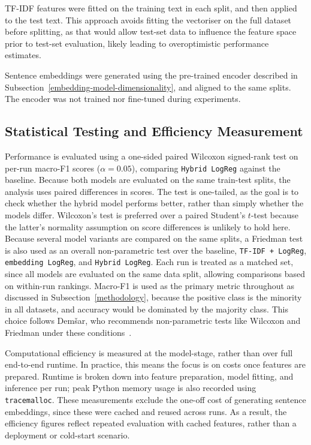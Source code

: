 \documentclass[10pt,a4paper]{article}
\begin{document}
TF-IDF features were fitted on the training text in each split, and then applied to the test text. This approach avoids fitting the vectoriser on the full dataset before splitting, as that would allow test-set data to influence the feature space prior to test-set evaluation, likely leading to overoptimistic performance estimates.

Sentence embeddings were generated using the pre-trained encoder described in Subsection~\ref{embedding-model-dimensionality}, and aligned to the same splits. The encoder was not trained nor fine-tuned during experiments.


\subsection{Statistical Testing and Efficiency Measurement}

Performance is evaluated using a one-sided paired Wilcoxon signed-rank test on per-run macro-F1 scores ($\alpha = 0.05$), comparing \texttt{Hybrid LogReg} against the baseline. Because both models are evaluated on the same train-test splits, the analysis uses paired differences in scores. The test is one-tailed, as the goal is to check whether the hybrid model performs better, rather than simply whether the models differ. Wilcoxon's test is preferred over a paired Student's $t$-test because the latter's normality assumption on score differences is unlikely to hold here. Because several model variants are compared on the same splits, a Friedman test is also used as an overall non-parametric test over the baseline, \texttt{TF-IDF + LogReg}, \texttt{embedding LogReg}, and \texttt{Hybrid LogReg}. Each run is treated as a matched set, since all models are evaluated on the same data split, allowing comparisons based on within-run rankings. Macro-F1 is used as the primary metric throughout as discussed in Subsection~\ref{methodology}, because the positive class is the minority in all datasets, and accuracy would be dominated by the majority class. This choice follows Dem\v{s}ar, who recommends non-parametric tests like Wilcoxon and Friedman under these conditions~\cite{10.5555/1248547.1248548}.


Computational efficiency is measured at the model-stage, rather than over full end-to-end runtime. In practice, this means the focus is on costs once features are prepared. Runtime is broken down into feature preparation, model fitting, and inference per run; peak Python memory usage is also recorded using \texttt{tracemalloc}. These measurements exclude the one-off cost of generating sentence embeddings, since these were cached and reused across runs. As a result, the efficiency figures reflect repeated evaluation with cached features, rather than a deployment or cold-start scenario.
\end{document}
